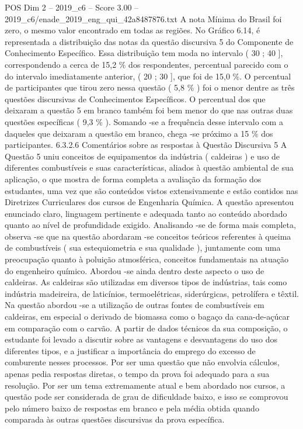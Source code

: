 \begin{textsample}{POS Dim 2 – 2019\_c6 – Score 3.00 – 2019\_c6/enade\_2019\_eng\_qui\_42a8487876.txt}
A nota Mínima do Brasil foi zero, o mesmo valor encontrado em todas as regiões.
No Gráfico 6.14, é representada a distribuição das notas da questão discursiva 5 do Componente de Conhecimento Específico.
Essa distribuição tem moda no intervalo ( 30 ; 40 ], correspondendo a cerca de 15,2 \% dos respondentes, percentual parecido com o do intervalo imediatamente anterior, ( 20 ; 30 ], que foi de 15,0 \%.
O percentual de participantes que tirou zero nessa questão ( 5,8 \% ) foi o menor dentre as três questões discursivas de Conhecimentos Específicos.
O percentual dos que deixaram a questão 5 em branco também foi bem menor do que nas outras duas questões específicas ( 9,3 \% ).
Somando -se a frequência desse intervalo com a daqueles que deixaram a questão em branco, chega -se próximo a 15 \% dos participantes. 6.3.2.6 Comentários sobre as respostas à Questão Discursiva 5 A Questão 5 uniu conceitos de equipamentos da indústria ( caldeiras ) e uso de diferentes combustíveis e suas características, aliados à questão ambiental de sua aplicação, o que mostra de forma completa a avaliação da formação dos estudantes, uma vez que são conteúdos vistos extensivamente e estão contidos nas Diretrizes Curriculares dos cursos de Engenharia Química.
A questão apresentou enunciado claro, linguagem pertinente e adequada tanto ao conteúdo abordado quanto ao nível de profundidade exigido.
Analisando -se de forma mais completa, observa -se que na questão abordaram -se conceitos teóricos referentes à queima de combustíveis ( sua estequiometria e sua qualidade ), juntamente com uma preocupação quanto à poluição atmosférica, conceitos fundamentais na atuação do engenheiro químico.
Abordou -se ainda dentro deste aspecto o uso de caldeiras.
As caldeiras são utilizadas em diversos tipos de indústrias, tais como indústria madeireira, de laticínios, termoelétricas, siderúrgicas, petrolífera e têxtil.
Na questão abordou -se a utilização de outras fontes de combustíveis em caldeiras, em especial o derivado de biomassa como o bagaço da cana-de-açúcar em comparação com o carvão.
A partir de dados técnicos da sua composição, o estudante foi levado a discutir sobre as vantagens e desvantagens do uso dos diferentes tipos, e a justificar a importância do emprego do excesso de comburente nesses processos.
Por ser uma questão que não envolvia cálculos, apenas pedia respostas diretas, o tempo da prova foi adequado para a sua resolução.
Por ser um tema extremamente atual e bem abordado nos cursos, a questão pode ser considerada de grau de dificuldade baixo, e isso se comprovou pelo número baixo de respostas em branco e pela média obtida quando comparada às outras questões discursivas da prova específica.

\end{textsample}
